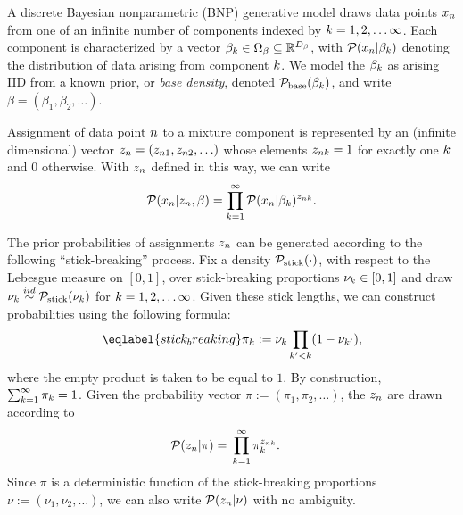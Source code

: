 A discrete Bayesian nonparametric (BNP) generative model draws data points
$x_n$ from one of an infinite number of components indexed by $k = 1, 2,
\ldots \infty$. Each component is characterized by a vector $\beta_k \in
\Omega_{\beta} \subseteq \mathbb{R}^{{D_{\beta}}}$, with $\mathcal{P}(x_n \vert \beta_k)$
denoting the distribution of data arising from  component $k$. We model the
$\beta_k$ as arising IID from a known prior, or \textit{base density},
denoted $\mathcal{P}_{\mathrm{base}}(\beta_k)$, and write $\beta = (\beta_1, \beta_2, \ldots)$.

Assignment of data point $n$ to a mixture component is represented by an
(infinite dimensional) vector $z_n = (z_{n1}, z_{n2}, \ldots)$ whose
elements $z_{nk} = 1$ for exactly one $k$ and $0$ otherwise. With $z_n$
defined in this way, we can write
%
\begin{align*}
%
\p(\x_n \vert \z_\n, \beta) =
    \prod_{k=1}^\infty \p(\x_n \vert \beta_\k)^{\z_{\n\k}}.
%
\end{align*}

The prior probabilities of assignments $z_{n}$ can be generated according to
the following ``stick-breaking'' process. Fix a density $\mathcal{P}_{\mathrm{stick}}(\cdot)$, with
respect to the Lebesgue measure on $[0,1]$, over stick-breaking proportions
$\nu_{k} \in [0, 1]$ and draw $\nu_{k}\overset{iid}{\sim}\mathcal{P}_{\mathrm{stick}}(\nu_{k})$ for $k=1,2,\ldots\infty$.
Given these stick lengths, we can construct probabilities using the following
formula:
%
\begin{align}\eqlabel{stick_breaking}
%
\pi_\k := \nuk \prod_{\k' < \k} (1 - \nu_{\k'}),
%
\end{align}
%
where the empty product is taken to be equal to $1$. By construction,
$\sum_{k=1}^{\infty} \pi_k = 1$. Given the probability vector $\pi := (\pi_1,
\pi_2, \ldots)$, the $z_n$ are drawn according to
%
\begin{align*}
%
\p(\z_\n \vert \pi) ={}&
   \prod_{k=1}^{\infty} \pi_\k^{\z_{\n\k}}.
%
\end{align*}
%
Since $\pi$ is a deterministic function of the stick-breaking proportions $\nu :=
(\nu_1, \nu_2, \ldots)$, we can also write $\mathcal{P}(z_n \vert \nu)$ with no
ambiguity.

